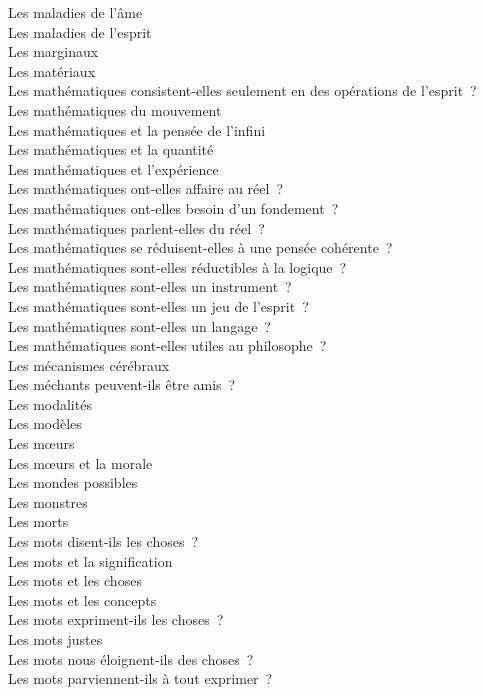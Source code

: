 \documentclass[a4paper,12pt]{article}
\begin{document}
Les maladies de l'âme \\
Les maladies de l'esprit \\
Les marginaux \\
Les matériaux \\
Les mathématiques consistent-elles seulement en des opérations de l'esprit ? \\
Les mathématiques du mouvement \\
Les mathématiques et la pensée de l'infini \\
Les mathématiques et la quantité \\
Les mathématiques et l'expérience \\
Les mathématiques ont-elles affaire au réel ? \\
Les mathématiques ont-elles besoin d'un fondement ? \\
Les mathématiques parlent-elles du réel ? \\
Les mathématiques se réduisent-elles à une pensée cohérente ? \\
Les mathématiques sont-elles réductibles à la logique ? \\
Les mathématiques sont-elles un instrument ? \\
Les mathématiques sont-elles un jeu de l'esprit ? \\
Les mathématiques sont-elles un langage ? \\
Les mathématiques sont-elles utiles au philosophe ? \\
Les mécanismes cérébraux \\
Les méchants peuvent-ils être amis ? \\
Les modalités \\
Les modèles \\
Les mœurs \\
Les mœurs et la morale \\
Les mondes possibles \\
Les monstres \\
Les morts \\
Les mots disent-ils les choses ? \\
Les mots et la signification \\
Les mots et les choses \\
Les mots et les concepts \\
Les mots expriment-ils les choses ? \\
Les mots justes \\
Les mots nous éloignent-ils des choses ? \\
Les mots parviennent-ils à tout exprimer ? \\
\end{document}
